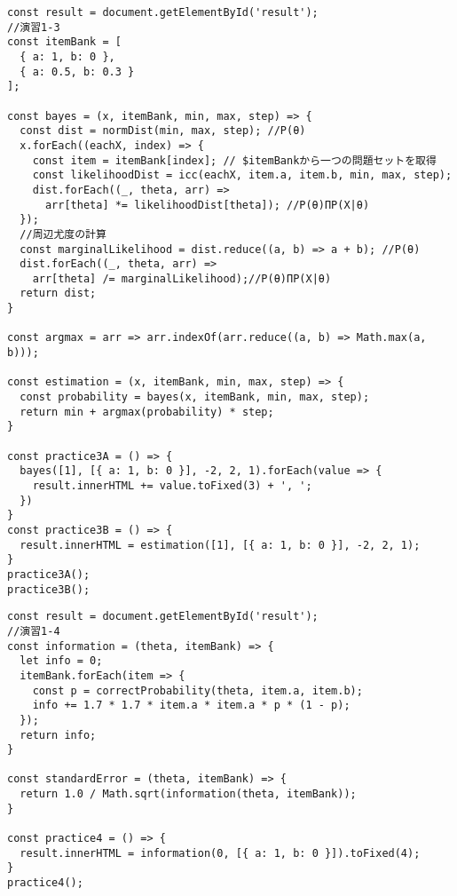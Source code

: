 \documentclass[12pt]{jarticle}
\begin{document}
\begin{lstlisting}[style=JavaScript, caption={演習1-3}]
const result = document.getElementById('result');
//演習1-3
const itemBank = [
  { a: 1, b: 0 },
  { a: 0.5, b: 0.3 }
];

const bayes = (x, itemBank, min, max, step) => {
  const dist = normDist(min, max, step); //P(θ)
  x.forEach((eachX, index) => {
    const item = itemBank[index]; // $itemBankから一つの問題セットを取得
    const likelihoodDist = icc(eachX, item.a, item.b, min, max, step);
    dist.forEach((_, theta, arr) =>
      arr[theta] *= likelihoodDist[theta]); //P(θ)ΠP(X|θ)
  });
  //周辺尤度の計算
  const marginalLikelihood = dist.reduce((a, b) => a + b); //P(θ)
  dist.forEach((_, theta, arr) =>
    arr[theta] /= marginalLikelihood);//P(θ)ΠP(X|θ)
  return dist;
}

const argmax = arr => arr.indexOf(arr.reduce((a, b) => Math.max(a, b)));

const estimation = (x, itemBank, min, max, step) => {
  const probability = bayes(x, itemBank, min, max, step);
  return min + argmax(probability) * step;
}

const practice3A = () => {
  bayes([1], [{ a: 1, b: 0 }], -2, 2, 1).forEach(value => {
    result.innerHTML += value.toFixed(3) + ', ';
  })
}
const practice3B = () => {
  result.innerHTML = estimation([1], [{ a: 1, b: 0 }], -2, 2, 1);
}
practice3A();
practice3B();
\end{lstlisting}
\begin{lstlisting}[style=JavaScript, caption={演習1-4}]
const result = document.getElementById('result');
//演習1-4
const information = (theta, itemBank) => {
  let info = 0;
  itemBank.forEach(item => {
    const p = correctProbability(theta, item.a, item.b);
    info += 1.7 * 1.7 * item.a * item.a * p * (1 - p);
  });
  return info;
}

const standardError = (theta, itemBank) => {
  return 1.0 / Math.sqrt(information(theta, itemBank));
}

const practice4 = () => {
  result.innerHTML = information(0, [{ a: 1, b: 0 }]).toFixed(4);
}
practice4();

\end{lstlisting}
\end{document}
